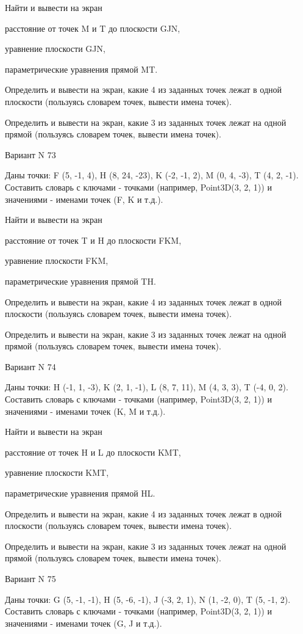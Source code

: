 \documentclass[11pt]{report}
\begin{document}
Найти и вывести на экран


расстояние от точек M и T до плоскости GJN,


уравнение плоскости GJN,


параметрические уравнения прямой MT.


Определить и вывести на экран, какие 4 из заданных точек лежат в одной плоскости (пользуясь словарем точек, вывести имена точек).


Определить и вывести на экран, какие 3 из заданных точек лежат на одной прямой (пользуясь словарем точек, вывести имена точек).

\newpage
Вариант N 73

Даны точки: F (5, -1, 4), H (8, 24, -23), K (-2, -1, 2), M (0, 4, -3), T (4, 2, -1).
Составить словарь с ключами - точками (например, Point3D(3, 2, 1)) и значениями - именами точек (F, K и т.д.).


Найти и вывести на экран


расстояние от точек T и H до плоскости FKM,


уравнение плоскости FKM,


параметрические уравнения прямой TH.


Определить и вывести на экран, какие 4 из заданных точек лежат в одной плоскости (пользуясь словарем точек, вывести имена точек).


Определить и вывести на экран, какие 3 из заданных точек лежат на одной прямой (пользуясь словарем точек, вывести имена точек).

\newpage
Вариант N 74

Даны точки: H (-1, 1, -3), K (2, 1, -1), L (8, 7, 11), M (4, 3, 3), T (-4, 0, 2).
Составить словарь с ключами - точками (например, Point3D(3, 2, 1)) и значениями - именами точек (K, M и т.д.).


Найти и вывести на экран


расстояние от точек H и L до плоскости KMT,


уравнение плоскости KMT,


параметрические уравнения прямой HL.


Определить и вывести на экран, какие 4 из заданных точек лежат в одной плоскости (пользуясь словарем точек, вывести имена точек).


Определить и вывести на экран, какие 3 из заданных точек лежат на одной прямой (пользуясь словарем точек, вывести имена точек).

\newpage
Вариант N 75

Даны точки: G (5, -1, -1), H (5, -6, -1), J (-3, 2, 1), N (1, -2, 0), T (5, -1, 2).
Составить словарь с ключами - точками (например, Point3D(3, 2, 1)) и значениями - именами точек (G, J и т.д.).
\end{document}
